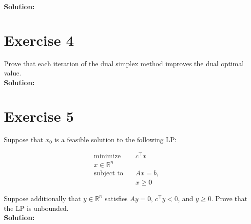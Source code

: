\documentclass{article}
\begin{document}
\textbf{Solution:} \\



\newpage

\section*{Exercise 4}
Prove that each iteration of the dual simplex method improves the dual optimal value. \\

\textbf{Solution:} \\



\newpage

\section*{Exercise 5}
Suppose that $x_0$ is a feasible solution to the following LP:

\begin{align*}
\text{minimize} \quad & c^\top x\\
x \in \mathbb{R}^n \quad & \\
\text{subject to} \quad & Ax = b,\\
& x \geq 0
\end{align*}

Suppose additionally that $y \in \mathbb{R}^n$ satisfies $Ay = 0$, $c^\top y < 0$, and $y \geq 0$. Prove that the LP is unbounded. \\

\textbf{Solution:} \\
\end{document}
